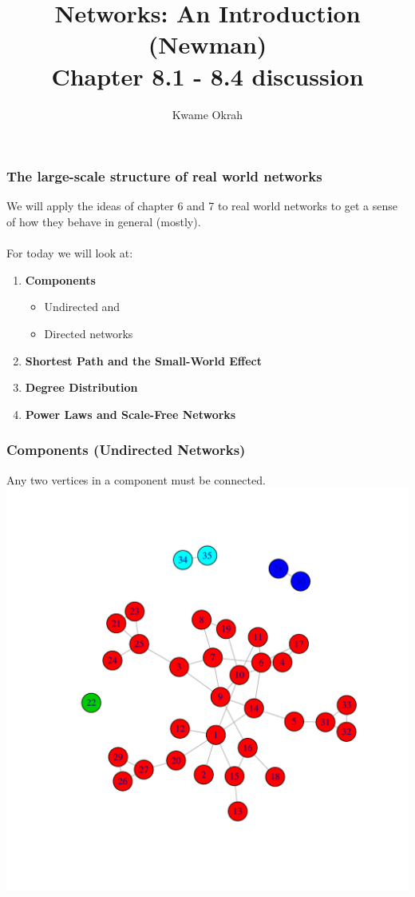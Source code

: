 \documentclass[smaller]{beamer}
\begin{document}
 
\title{Networks: An Introduction (Newman)\\
       Chapter 8.1 - 8.4 discussion}
\author{Kwame Okrah} 
\maketitle

\begin{frame}
   \frametitle{The large-scale structure of real world networks}
    We will apply the ideas of chapter 6 and 7
    to real world networks to get a sense of how they behave in general (mostly).\\
    ${}$\\
    For today we will look at:
    \begin{enumerate}
    \item {\bf Components} 
    \begin{itemize}
        \item Undirected and 
        \item Directed networks
    \end{itemize}
    \item {\bf Shortest Path and the Small-World Effect}
    \item {\bf Degree Distribution}
    \item {\bf Power Laws and Scale-Free Networks}
    \end{enumerate}
\end{frame}

\begin{frame}
   \frametitle{Components (Undirected Networks)}
   Any two vertices in a component must be connected.
   \includegraphics[scale=0.5]{figures/ug.pdf} 
\end{frame}
\end{document}
